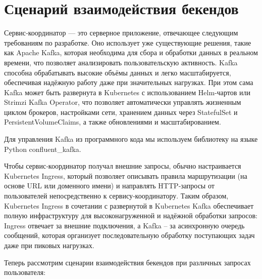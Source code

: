 \section*{Сценарий взаимодействия бекендов}

Сервис‑координатор — это серверное приложение, отвечающее следующим требованиям по разработке. 
Оно использует уже существующие решения, такие как Apache Kafka, которая необходима для сбора и обработки данных в реальном времени, что позволяет анализировать пользовательскую активность. 
Kafka способна обрабатывать высокие объёмы данных и легко масштабируется, обеспечивая надёжную работу даже при значительных нагрузках. 
При этом сама Kafka может быть развернута в Kubernetes с использованием Helm‑чартов или Strimzi Kafka Operator, что позволяет автоматически управлять жизненным циклом брокеров, настройками сети, хранением данных через StatefulSet и PersistentVolumeClaims, а также обновлениями и масштабированием.

Для управления Kafka из программного кода мы используем библиотеку на языке Python confluent\_kafka.

Чтобы сервис‑координатор получал внешние запросы, обычно настраивается Kubernetes Ingress, который позволяет описывать правила маршрутизации (на основе URL или доменного имени) и направлять HTTP‑запросы от пользователей непосредственно к сервису‑координатору. 
Таким образом, Kubernetes Ingress в сочетании с развернутой в Kubernetes Kafka обеспечивает полную инфраструктуру для высоконагруженной и надёжной обработки запросов: Ingress отвечает за внешние подключения, а Kafka – за асинхронную очередь сообщений, которая организует последовательную обработку поступающих задач даже при пиковых нагрузках.

Теперь рассмотрим сценарии взаимодействия бекендов при различных запросах пользователя:

